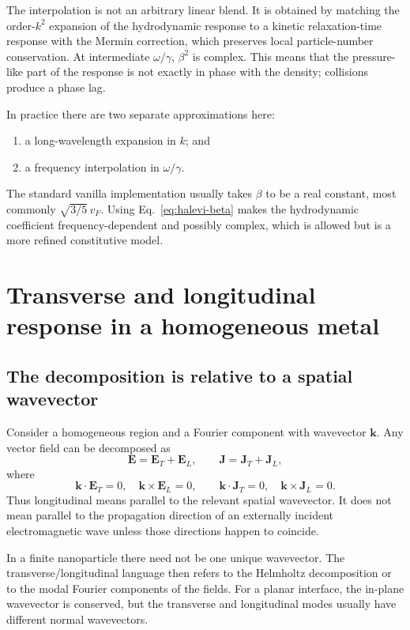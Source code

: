 \documentclass[11pt,a4paper]{article}
\newcommand{\E}{\mathbf E}
\newcommand{\J}{\mathbf J}
\newcommand{\vF}{v_F}
\begin{document}
The interpolation is not an arbitrary linear blend.  It is obtained by
matching the order-\(k^2\) expansion of the hydrodynamic response to a kinetic
relaxation-time response with the Mermin correction, which preserves local
particle-number conservation.  At intermediate \(\omega/\gamma\), \(\beta^2\)
is complex.  This means that the pressure-like part of the response is not
exactly in phase with the density; collisions produce a phase lag.

In practice there are two separate approximations here:
\begin{enumerate}
    \item a long-wavelength expansion in \(k\); and
    \item a frequency interpolation in \(\omega/\gamma\).
\end{enumerate}
The standard vanilla implementation usually takes \(\beta\) to be a real
constant, most commonly \(\sqrt{3/5}\,\vF\).  Using Eq.~\eqref{eq:halevi-beta}
makes the hydrodynamic coefficient frequency-dependent and possibly complex,
which is allowed but is a more refined constitutive model.

\section{Transverse and longitudinal response in a homogeneous metal}

\subsection{The decomposition is relative to a spatial wavevector}

Consider a homogeneous region and a Fourier component with wavevector
\(\mathbf k\).  Any vector field can be decomposed as
\begin{equation}
    \E=\E_T+\E_L,
    \qquad
    \J=\J_T+\J_L,
    \label{eq:T-L-decomposition}
\end{equation}
where
\begin{equation}
    \mathbf k\!\cdot\!\E_T=0,
    \quad
    \mathbf k\times\E_L=0,
    \qquad
    \mathbf k\!\cdot\!\J_T=0,
    \quad
    \mathbf k\times\J_L=0.
    \label{eq:T-L-definitions}
\end{equation}
Thus longitudinal means parallel to the relevant spatial wavevector.  It
does not mean parallel to the propagation direction of an externally incident
electromagnetic wave unless those directions happen to coincide.

In a finite nanoparticle there need not be one unique wavevector.  The
transverse/longitudinal language then refers to the Helmholtz decomposition or
to the modal Fourier components of the fields.  For a planar interface, the
in-plane wavevector is conserved, but the transverse and longitudinal modes
usually have different normal wavevectors.
\end{document}
